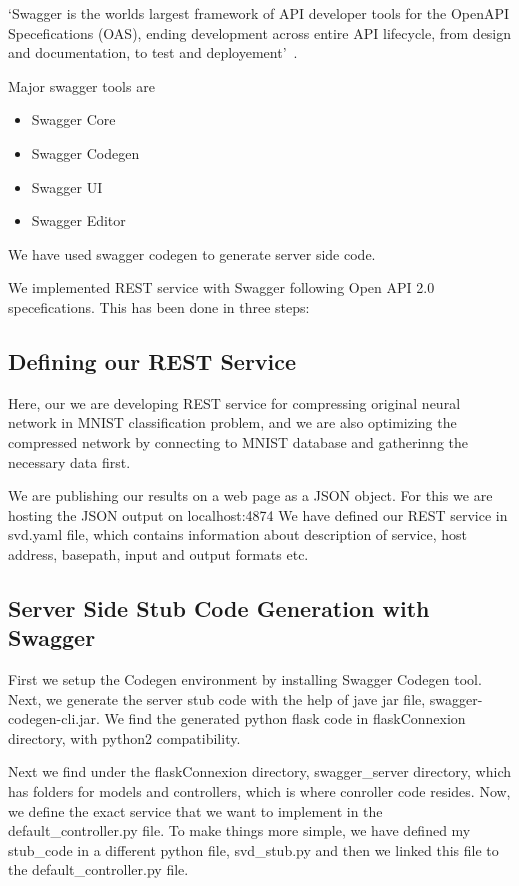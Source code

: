`Swagger is the worlds largest framework of API developer tools for the OpenAPI
 Specefications (OAS), ending development across entire API lifecycle, from
 design and documentation, to test and deployement'~\cite{hid-sp18-401-Swagger-Service}.

 Major swagger tools are 

\begin{itemize}

  \item Swagger Core
  \item Swagger Codegen
  \item Swagger UI
  \item Swagger Editor

\end{itemize}

We have used swagger codegen to generate server side code. 

We implemented REST service with Swagger following Open API 2.0 
specefications. This has been done in three steps:

\subsection{Defining our REST Service}

Here, our we are developing REST service for compressing original neural network
in MNIST classification problem, and we are also optimizing the compressed
network by connecting to MNIST database and gatherinng the necessary data first.

We are publishing our results on a web page as a JSON object. For this we are
hosting the JSON output on localhost:4874 We have defined our REST service in
svd.yaml file, which contains information about description of service, host
address, basepath, input and output formats etc.

\subsection{Server Side Stub Code Generation with Swagger} 

First we setup the Codegen environment by installing Swagger Codegen tool. Next,
we generate the server stub code with the help of jave jar file, swagger-
codegen-cli.jar. We find the generated python flask code in flaskConnexion
directory, with python2 compatibility.

Next we find under the flaskConnexion directory, swagger\_server directory, which
has folders for models and controllers, which is where conroller code resides.
Now, we define the exact service that we want to implement in the
default\_controller.py file. To make things more simple, we have defined my
stub\_code in a different python file, svd\_stub.py and then we linked this file
to the default\_controller.py file.

